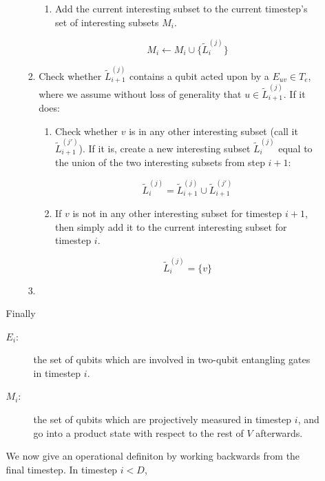 \begin{enumerate}
\begin{enumerate}
\begin{enumerate}
\begin{enumerate}
\begin{enumerate}
\item
Add the current interesting subset to the current timestep's set of interesting subsets $M_i$.

\begin{equation}
M_i \leftarrow M_i \cup \{ \tilde{L}^{(j)}_{i} \}
\end{equation}

\end{enumerate}

\item Check whether $\tilde{L}^{(j)}_{i+1}$ contains a qubit acted upon by a
$E_{uv} \in T_e$, where we assume without loss of generality that
$u \in \tilde{L}^{(j)}_{i+1}$. If it does:

\begin{enumerate}
\item Check whether $v$ is in any other interesting subset
(call it $\tilde{L}^{(j')}_{i+1}$). If it is, create a new interesting subset
$\tilde{L}^{(j)}_{i}$ equal to the union of the two interesting subsets from
step $i+1$:

\begin{equation}
\tilde{L}^{(j)}_{i} = \tilde{L}^{(j)}_{i+1} \cup \tilde{L}^{(j')}_{i+1}
\end{equation}

\item If $v$ is not in any other interesting subset for timestep $i+1$,
then simply add it to the current interesting subset for timestep $i$.

\begin{equation}
\tilde{L}^{(j)}_{i} = \{v\}
\end{equation}
\end{enumerate}

\item
\end{enumerate}
\end{enumerate}

Finally 
\begin{description}
\item[$E_{i}$:] the set of qubits which are involved in two-qubit entangling
gates in timestep $i$.
\item[$M_{i}$:] the set of qubits which are projectively measured in timestep $i$,
and go into a product state with respect to the rest of $V$ afterwards.
\end{description}

We now give an operational definiton by working backwards from the final timestep.
In timestep $i < D$,


\end{enumerate}
\end{enumerate}

